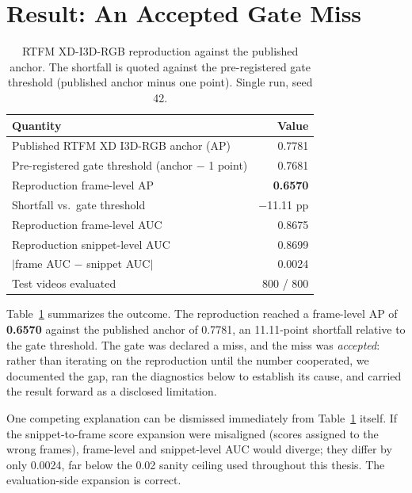 \section{Result: An Accepted Gate Miss}
\label{sec:appa-result}

\begin{table}[t]
\centering
\caption{RTFM XD-I3D-RGB reproduction against the published anchor. The
shortfall is quoted against the pre-registered gate threshold (published
anchor minus one point). Single run, seed 42.}
\label{tab:appa-gate}
\begin{tabular}{lr}
\toprule
Quantity & Value \\
\midrule
Published RTFM XD I3D-RGB anchor (AP) & 0.7781 \\
Pre-registered gate threshold (anchor $-$ 1 point) & 0.7681 \\
Reproduction frame-level AP & \textbf{0.6570} \\
Shortfall vs.\ gate threshold & $-$11.11 pp \\
\midrule
Reproduction frame-level AUC & 0.8675 \\
Reproduction snippet-level AUC & 0.8699 \\
$|$frame AUC $-$ snippet AUC$|$ & 0.0024 \\
Test videos evaluated & 800 / 800 \\
\bottomrule
\end{tabular}
\end{table}

Table~\ref{tab:appa-gate} summarizes the outcome. The reproduction reached a
frame-level AP of \textbf{0.6570} against the published anchor of 0.7781,
an 11.11-point shortfall relative to the gate threshold. The gate was
declared a miss, and the miss was \emph{accepted}: rather than iterating on
the reproduction until the number cooperated, we documented the gap, ran the
diagnostics below to establish its cause, and carried the result forward as
a disclosed limitation.

One competing explanation can be dismissed immediately from
Table~\ref{tab:appa-gate} itself. If the snippet-to-frame score expansion
were misaligned (scores assigned to the wrong frames), frame-level and
snippet-level AUC would diverge; they differ by only 0.0024, far below the
0.02 sanity ceiling used throughout this thesis. The evaluation-side
expansion is correct.



